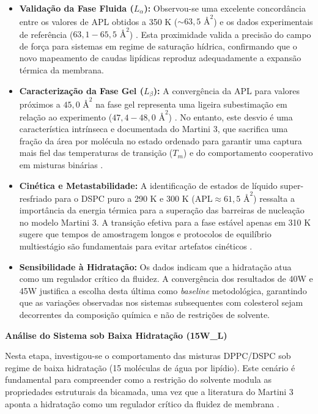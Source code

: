 \begin{itemize}
    \item \textbf{Validação da Fase Fluida ($L_\alpha$):} Observou-se uma excelente concordância entre os valores de APL obtidos a 350 K ($\sim 63,5 \text{ \AA}^2$) e os dados experimentais de referência ($63,1 - 65,5 \text{ \AA}^2$) \cite{pedersen2024}. Esta proximidade valida a precisão do campo de força para sistemas em regime de saturação hídrica, confirmando que o novo mapeamento de caudas lipídicas reproduz adequadamente a expansão térmica da membrana.
    
    \item \textbf{Caracterização da Fase Gel ($L_\beta$):} A convergência da APL para valores próximos a $45,0 \text{ \AA}^2$ na fase gel representa uma ligeira subestimação em relação ao experimento ($47,4 - 48,0 \text{ \AA}^2$) \cite{pedersen2024}. No entanto, este desvio é uma característica intrínseca e documentada do Martini 3, que sacrifica uma fração da área por molécula no estado ordenado para garantir uma captura mais fiel das temperaturas de transição ($T_m$) e do comportamento cooperativo em misturas binárias \cite{pedersen2024}.
    
    \item \textbf{Cinética e Metastabilidade:} A identificação de estados de líquido super-resfriado para o DSPC puro a 290 K e 300 K ($\text{APL} \approx 61,5 \text{ \AA}^2$) ressalta a importância da energia térmica para a superação das barreiras de nucleação no modelo Martini 3. A transição efetiva para a fase estável apenas em 310 K sugere que tempos de amostragem longos e protocolos de equilíbrio multiestágio são fundamentais para evitar artefatos cinéticos \cite{pedersen2024}.
    
    \item \textbf{Sensibilidade à Hidratação:} Os dados indicam que a hidratação atua como um regulador crítico da fluidez. A convergência dos resultados de 40W e 45W justifica a escolha desta última como \textit{baseline} metodológica, garantindo que as variações observadas nos sistemas subsequentes com colesterol sejam decorrentes da composição química e não de restrições de solvente.
\end{itemize}

\vspace{1em}
\noindent\textbf{Análise do Sistema sob Baixa Hidratação (15W\_L) }

Nesta etapa, investigou-se o comportamento das misturas DPPC/DSPC sob regime de baixa hidratação (15 moléculas de água por lipídio). Este cenário é fundamental para compreender como a restrição do solvente modula as propriedades estruturais da bicamada, uma vez que a literatura do Martini 3 aponta a hidratação como um regulador crítico da fluidez de membrana \cite{pedersen2024}.


